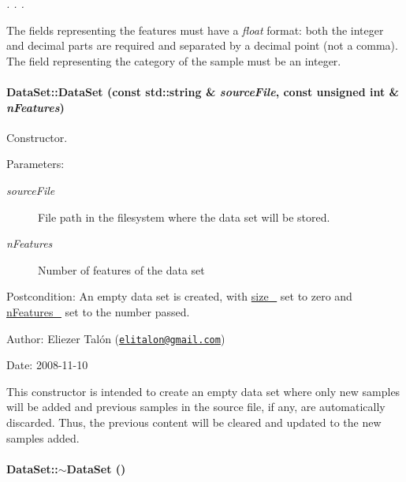 {\em . . .\/}

The fields representing the features must have a {\em float\/} format: both the integer and decimal parts are required and separated by a decimal point (not a comma). The field representing the category of the sample must be an integer. \hypertarget{class_data_set_ffb28bf240421998cd5470f594a6bb22}{
\paragraph[{DataSet}]{\setlength{\rightskip}{0pt plus 5cm}DataSet::DataSet (const std::string \& {\em sourceFile}, \/  const unsigned int \& {\em nFeatures})}\hfill}
\label{class_data_set_ffb28bf240421998cd5470f594a6bb22}


Constructor. 

\begin{Desc}
\item[Parameters:]
\begin{description}
\item[{\em sourceFile}]File path in the filesystem where the data set will be stored. \item[{\em nFeatures}]Number of features of the data set\end{description}
\end{Desc}
\begin{Desc}
\item[Postcondition:]An empty data set is created, with \hyperlink{class_data_set_b25b58d12a1f41ec758471bb663c8fa5}{size\_\-} set to zero and \hyperlink{class_data_set_5b263b90a7055808071f1c46e95b9b5c}{nFeatures\_\-} set to the number passed.\end{Desc}
\begin{Desc}
\item[Author:]Eliezer Talón (\href{mailto:elitalon@gmail.com}{\tt elitalon@gmail.com}) \end{Desc}
\begin{Desc}
\item[Date:]2008-11-10\end{Desc}
This constructor is intended to create an empty data set where only new samples will be added and previous samples in the source file, if any, are automatically discarded. Thus, the previous content will be cleared and updated to the new samples added. \hypertarget{class_data_set_2cdb84d32331956b413ca36933e516bd}{
\paragraph[{$\sim$DataSet}]{\setlength{\rightskip}{0pt plus 5cm}DataSet::$\sim$DataSet ()}\hfill}
\label{class_data_set_2cdb84d32331956b413ca36933e516bd}


